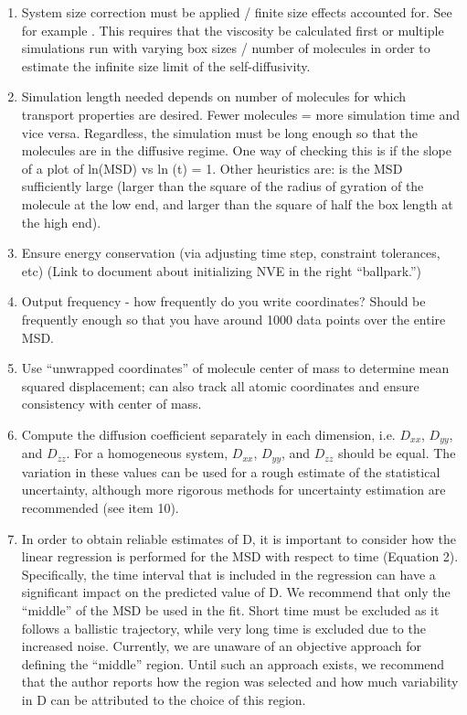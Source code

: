 \documentclass[9pt]{livecoms}
\begin{document}
\begin{enumerate}
\begin{enumerate}
	\end{enumerate}
	\item System size correction must be applied / finite size effects accounted for. See for example \cite{Yeh2004,Moultos2016}. This requires that the viscosity be calculated first or multiple simulations run with varying box sizes / number of molecules in order to estimate the infinite size limit of the self-diffusivity.
	\item Simulation length needed depends on number of molecules for which transport properties are desired. Fewer molecules = more simulation time and vice versa. Regardless, the simulation must be long enough so that the molecules are in the diffusive regime. One way of checking this is if the slope of a plot of ln(MSD) vs ln (t) = 1. Other heuristics are: is the MSD sufficiently large (larger than the square of the radius of gyration of the molecule at the low end, and larger than the square of half the box length at the high end).
	\item Ensure energy conservation (via adjusting time step, constraint tolerances, etc) (Link to document about initializing NVE in the right “ballpark.”) 
	\item Output frequency - how frequently do you write coordinates? Should be frequently enough so that you have around 1000 data points over the entire MSD.
	\item Use ``unwrapped coordinates'' of molecule center of mass to determine mean squared displacement; can also track all atomic coordinates and ensure consistency with center of mass.
	\item Compute the diffusion coefficient separately in each dimension, i.e. $D_{xx}$, $D_{yy}$, and $D_{zz}$. For a homogeneous system, $D_{xx}$, $D_{yy}$, and $D_{zz}$ should be equal. The variation in these values can be used for a rough estimate of the statistical uncertainty, although more rigorous methods for uncertainty estimation are recommended (see item 10).
	\item In order to obtain reliable estimates of D, it is important to consider how the linear regression is performed for the MSD with respect to time (Equation 2). Specifically, the time interval that is included in the regression can have a significant impact on the predicted value of D. We recommend that only the “middle” of the MSD be used in the fit. Short time must be excluded as it follows a ballistic trajectory, while very long time is excluded due to the increased noise. Currently, we are unaware of an objective approach for defining the “middle” region. Until such an approach exists, we recommend that the author reports how the region was selected and how much variability in D can be attributed to the choice of this region. 

\end{enumerate}
\end{document}
